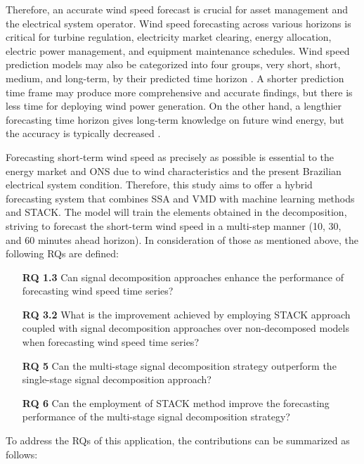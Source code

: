 Therefore, an accurate wind speed forecast is crucial for asset management and the electrical system operator. Wind speed forecasting across various horizons is critical for turbine regulation, electricity market clearing, energy allocation, electric power management, and equipment maintenance schedules. Wind speed prediction models may also be categorized into four groups, very short, short, medium, and long-term, by their predicted time horizon \cite{liu2019Data}. A shorter prediction time frame may produce more comprehensive and accurate findings, but there is less time for deploying wind power generation. On the other hand, a lengthier forecasting time horizon gives long-term knowledge on future wind energy, but the accuracy is typically decreased \cite{moreno2019Very}.

Forecasting short-term wind speed as precisely as possible is essential to the energy market and \ac{ONS} due to wind characteristics and the present Brazilian electrical system condition. Therefore, this study aims to offer a hybrid forecasting system that combines \ac{SSA} and \ac{VMD} with machine learning methods and \ac{STACK}. The model will train the elements obtained in the decomposition, striving to forecast the short-term wind speed in a multi-step manner (10, 30, and 60 minutes ahead horizon). In consideration of those as mentioned above, the following \ac{RQ}s are defined:

\begin{enumerate}[wide=0pt, leftmargin=3em]
    \item[\textbf{RQ 1.3}] Can signal decomposition approaches enhance the performance of forecasting wind speed time series?

    \item[\textbf{RQ 3.2}] What is the improvement achieved by employing \ac{STACK} approach coupled with signal decomposition approaches over non-decomposed models when forecasting wind speed time series?

    \item[\textbf{RQ 5}] Can the multi-stage signal decomposition strategy outperform the single-stage signal decomposition approach?

    \item[\textbf{RQ 6}] Can the employment of \ac{STACK} method improve the forecasting performance of the multi-stage signal decomposition strategy?
\end{enumerate}

To address the \ac{RQ}s of this application, the contributions can be summarized as follows:

